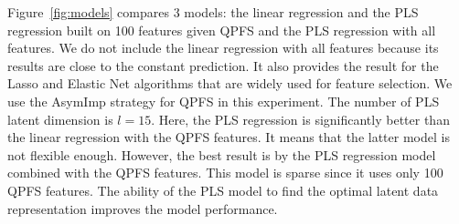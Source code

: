 \documentclass[preprint,12pt]{elsarticle}
\theoremstyle{definition}
\begin{document}
Figure~\ref{fig:models} compares 3 models: the linear regression and the PLS regression built on 100 features given QPFS and the PLS regression with all features.
We do not include the linear regression with all features because its results are close to the constant prediction. It also provides the result for the Lasso and Elastic Net algorithms that are widely used for feature selection.
We use the AsymImp strategy for QPFS in this experiment.
The number of PLS latent dimension is $l = 15$.
Here, the PLS regression is significantly better than the linear regression with the QPFS features.
It means that the latter model is not flexible enough.
However, the best result is by the PLS regression model combined with the QPFS features. 
This model is sparse since it uses only 100 QPFS features.
The ability of the PLS model to find the optimal latent data representation improves the model performance. 
\end{document}
